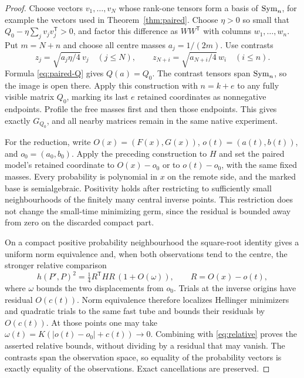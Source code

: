 \begin{proof}
Choose vectors $v_1,\ldots,v_N$ whose rank-one tensors form a basis of $\operatorname{Sym}_n$, for example the vectors used in Theorem~\ref{thm:paired}. Choose $\eta>0$ so small that
$Q_0-\eta\sum_jv_jv_j^{\mathsf T}>0$, and factor this difference as $WW^{\mathsf T}$ with columns $w_1,\ldots,w_n$. Put $m=N+n$ and choose all centre masses $a_j=1/(2m)$. Use contrasts
\[
 z_j=\sqrt{a_j\eta/4}\,v_j\quad(j\le N),\qquad
 z_{N+i}=\sqrt{a_{N+i}/4}\,w_i\quad(i\le n).
\]
Formula \eqref{eq:paired-Q} gives $Q(a)=Q_0$. The contrast tensors span $\operatorname{Sym}_n$, so the image is open there. Apply this construction with $n=k+e$ to any fully visible matrix $Q_0$, marking its last $e$ retained coordinates as nonnegative endpoints. Profile the free masses first and then those endpoints. This gives exactly $G_{Q_0}$, and all nearby matrices remain in the same native experiment.

For the reduction, write $O(x)=(F(x),G(x))$, $o(t)=(a(t),b(t))$, and $o_0=(a_0,b_0)$. Apply the preceding construction to $H$ and set the paired model's retained coordinate to $O(x)-o_0$ or to $o(t)-o_0$, with the same fixed masses. Every probability is polynomial in $x$ on the remote side, and the marked base is semialgebraic. Positivity holds after restricting to sufficiently small neighbourhoods of the finitely many central inverse points. This restriction does not change the small-time minimizing germ, since the residual is bounded away from zero on the discarded compact part.

On a compact positive probability neighbourhood the square-root identity gives a uniform norm equivalence and, when both observations tend to the centre, the stronger relative comparison
\[
 h(P',P)^2=\tfrac14 R^{\mathsf T}HR\,(1+O(\omega)),
 \qquad R=O(x)-o(t),
\]
where $\omega$ bounds the two displacements from $o_0$. Trials at the inverse origins have residual $O(c(t))$. Norm equivalence therefore localizes Hellinger minimizers and quadratic trials to the same fast tube and bounds their residuals by $O(c(t))$. At those points one may take
$\omega(t)=K(|o(t)-o_0|+c(t))\to0$. Combining with \eqref{eq:relative} proves the asserted relative bounds, without dividing by a residual that may vanish. The contrasts span the observation space, so equality of the probability vectors is exactly equality of the observations. Exact cancellations are preserved.
\end{proof}


